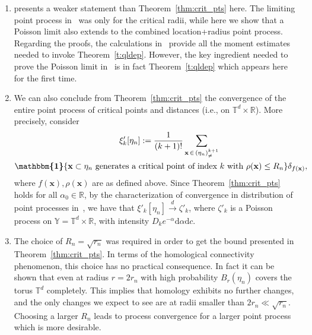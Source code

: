 \documentclass[AHL,Unicode,longabstracts]{cedram}
\newcommand{\bx}{\mathbf{x}}
\newcommand*\R{\mathbb{R}}
\newcommand*\T{\mathbb{T}}
\newcommand*\Y{\mathbb{Y}}
\newcommand*\md{\mathrm{d}}
\newcommand{\ind}{\boldsymbol{\mathbbm{1}}}
\begin{document}
\pagebreak
\begin{rema}\label{r:critpts}
\leavevmode
\begin{enumerate}
\item \cite[Theorem~8.1]{Bobrowski2019} presents a weaker statement than Theorem~\ref{thm:crit_pts} here. The limiting point process in~\cite{Bobrowski2019} was only for the critical radii, while here we show that a Poisson limit also extends to the combined location+radius point process. Regarding the proofs, the calculations in~\cite{Bobrowski2019} provide all the moment estimates needed to invoke Theorem~\ref{t:qldep}. However, the key ingredient needed to prove the Poisson limit in~\cite{Bobrowski2019} is in fact Theorem~\ref{t:qldep} which appears here for the first time.

\item We can also conclude from Theorem~\ref{thm:crit_pts} the convergence of the entire point process of critical points and distances (i.e., on $\T^d\times\R$). More precisely, consider
\begin{multline*}
\mkern35mu \xi'_k[\eta_n]
:= \frac{1}{(k+1)!} \sum_{\bx\,\in\,\left(\eta_n\right)^{k+1}_{\neq}}\\
 \ind\{\bx \subset \eta_n \text{ generates a critical point of index $k$ with }\rho(\bx) \leq R_n\}\delta_{f(\bx)},
\end{multline*}
where $f(\bx), \rho(\bx)$ are as defined above. Since Theorem~\ref{thm:crit_pts} holds for all $\alpha_0 \in \R$, {by the characterization of convergence in distribution of point processes in~\cite[Theorem~16.16]{KallenbergFoundations}}, we have that $\xi'_k[\eta_n] \stackrel{d}{\to} \zeta'_k$, where $\zeta'_k$ is a Poisson process on $\Y = \T^d\times \R$, with intensity $D_k e^{-\alpha}\md\alpha \md c$.

\item The choice of $R_n = \sqrt{r_n}$ was required in order to get the bound presented in Theorem~\ref{thm:crit_pts}. In terms of the homological connectivity phenomenon, this choice has no practical consequence. In fact it can be shown that even at radius $r=2r_n$ with high probability $B_r(\eta_n)$ covers the torus $\T^d$ completely. This implies that homology exhibits no further changes, and the only changes we expect to see are at radii smaller than $2r_n \ll \sqrt{r_n}$. Choosing a larger $R_n$ leads to process convergence for a larger point process which is more desirable.
\end{enumerate}

\end{rema}
\end{document}

